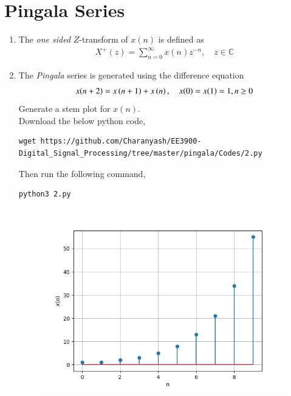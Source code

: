 \documentclass[journal,12pt,twocolumn]{IEEEtran}
\renewcommand\thesection{\arabic{section}}
\begin{document}
\section{Pingala Series}
\begin{enumerate}[label=\thesection.\arabic*,ref=\thesection.\theenumi]
\item The {\em one sided} $Z$-transform of $x(n)$ is defined as 
\begin{align}
	X^{+}(z) = \sum_{n = 0}^{\infty}x(n)z^{-n}, \quad z \in \mathbb{C}
\label{eq:one-Z}
\end{align}
	\item The {\em Pingala} series is generated using the difference equation 
\begin{align}
	x(n+2) = x\left(n+1\right) + x\left(n\right),  \quad x(0) = x(1) = 1, n \ge 0
	\label{eq:10-pingala}
\end{align}
Generate a stem plot for $x(n)$.\\
\solution Download the below python code,
  \begin{lstlisting}
wget https://github.com/Charanyash/EE3900-Digital_Signal_Processing/tree/master/pingala/Codes/2.py
  \end{lstlisting}
  Then run the following command,
  \begin{lstlisting}
python3 2.py
\end{lstlisting}
\begin{figure}[!ht]
 \includegraphics[width = \columnwidth]{Figs/2.2.png}
 \centering
 \caption{}
 \label{fig:5}
\end{figure}


\end{enumerate}
\end{document}
